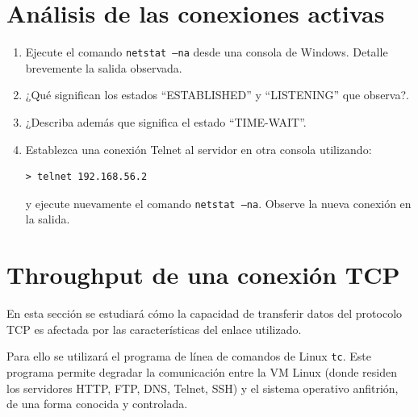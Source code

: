 \documentclass[a4paper,10pt]{article}
\begin{document}
\section{Análisis de las conexiones activas}

\begin{enumerate}
    \item Ejecute el comando \texttt{netstat –na} desde una consola de Windows. Detalle brevemente la salida observada.
    \item ¿Qué significan los estados ``ESTABLISHED'' y ``LISTENING'' que observa?.
    \item ¿Describa además que significa el estado ``TIME-WAIT''.
    \item Establezca una conexión Telnet al servidor en otra consola utilizando:
    \begin{verbatim}
> telnet 192.168.56.2
    \end{verbatim}
    y ejecute nuevamente el comando \texttt{netstat –na}. Observe la nueva conexión en la salida.
\end{enumerate}

\section{Throughput de una conexión TCP}

En esta sección se estudiará cómo la capacidad de transferir datos del protocolo TCP es afectada por las características del enlace utilizado.

Para ello se utilizará el programa de línea de comandos de Linux \texttt{tc}. Este programa permite degradar la comunicación entre la VM Linux (donde residen los servidores HTTP, FTP, DNS, Telnet, SSH) y el sistema operativo anfitrión, de una forma conocida y controlada.
\end{document}
